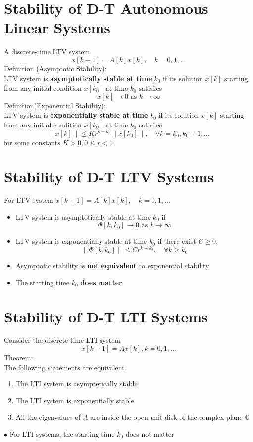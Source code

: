 \documentclass[10pt,a4paper,oneside]{article}
\begin{document}
\section{Stability of D-T Autonomous Linear Systems}
A discrete-time LTV system
\[
x[k+1]=A[k] x[k], \quad k=0,1, \ldots
\]
Definition (Asymptotic Stability):\\
LTV system is {\bfseries asymptotically stable at time} $k_{0}$ if its solution $x[k]$
starting from any initial condition $x\left[k_{0}\right]$ at time $k_{0}$ satisfies
\[
x[k] \rightarrow 0 \text { as } k \rightarrow \infty
\]
Definition(Exponential Stability):\\
LTV system is {\bfseries exponentially stable at time} $k_{0}$ if its solution $x[k]$
starting from any initial condition $x\left[k_{0}\right]$ at time $k_{0}$ satisfies
\[
\|x[k]\| \leq K r^{k-k_{0}}\left\|x\left[k_{0}\right]\right\|, \quad \forall k=k_{0}, k_{0}+1, \ldots
\]
for some constants $K>0, 0\leq r<1$
\section{Stability of D-T LTV Systems}
For LTV system $x[k+1]=A[k] x[k], \quad k=0,1, \ldots$
\begin{itemize}
\item LTV system is asymptotically stable at time $k_{0}$ if
\[
\Phi\left[k, k_{0}\right] \rightarrow 0 \text { as } k \rightarrow \infty
\]
\item LTV system is exponentially stable at time $k_0$ if there exist $C\geq0$,
\[
\left\|\Phi\left[k, k_{0}\right]\right\| \leq C r^{k-k_{0}}, \quad \forall k \geq k_{0}
\]
\item Asymptotic stability is {\bfseries not equivalent} to exponential stability
\item The starting time $k_0$ {\bfseries does matter}
\end{itemize}
\section{Stability of D-T LTI Systems}
Consider the discrete-time LTI system
\[
x[k+1] = Ax[k], k=0,1,...
\]
Theorem:\\
The following statements are equivalent
\begin{enumerate}
\item The LTI system is asymptetically stable
\item The LTI system is exponentially stable
\item All the eigenvalues of $A$ are inside the open unit disk of the complex plane $\mathbb{C}$
\end{enumerate}
$\bullet$ For LTI systems, the starting time $k_0$ does not matter
\end{document}
